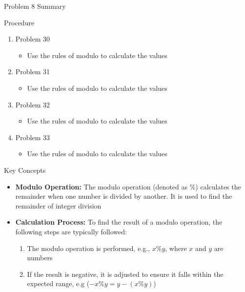 \begin{summary}{Problem 8 Summary}
    \begin{statement}{Procedure}
        \begin{enumerate}[start = 30]
            \item Problem 30
            \begin{itemize}
                \item Use the rules of modulo to calculate the values
            \end{itemize}
            \item Problem 31
            \begin{itemize}
                \item Use the rules of modulo to calculate the values
            \end{itemize}
            \item Problem 32
            \begin{itemize}
                \item Use the rules of modulo to calculate the values
            \end{itemize}
            \item Problem 33
            \begin{itemize}
                \item Use the rules of modulo to calculate the values
            \end{itemize}
        \end{enumerate}
    \end{statement}
    \begin{statement}{Key Concepts}
        \begin{itemize}
            \item \textbf{Modulo Operation:} The modulo operation (denoted as $\%$) calculates the remainder when one number is divided by another. It is used to find the remainder of integer division
            \item \textbf{Calculation Process:} To find the result of a modulo operation, the following steps are typically followed:
            \begin{enumerate}
                \item The modulo operation is performed, e.g., $x \% y$, where $x$ and $y$ are numbers
                \item If the result is negative, it is adjusted to ensure it falls within the expected range, e.g ($-x \% y = y - (x \% y)$)
            \end{enumerate}

\end{itemize}
\end{statement}
\end{summary}

